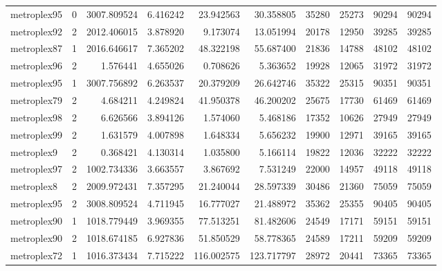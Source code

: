 \begin{longtable}{|l|r|r|r|r|r|r|r|r|r|}
metroplex95 & 0 & 3007.809524 & 6.416242 & 23.942563 & 30.358805 & 35280 & 25273 & 90294 & 90294 \\
metroplex92 & 2 & 2012.406015 & 3.878920 & 9.173074 & 13.051994 & 20178 & 12950 & 39285 & 39285 \\
metroplex87 & 1 & 2016.646617 & 7.365202 & 48.322198 & 55.687400 & 21836 & 14788 & 48102 & 48102 \\
metroplex96 & 2 & 1.576441 & 4.655026 & 0.708626 & 5.363652 & 19928 & 12065 & 31972 & 31972 \\
metroplex95 & 1 & 3007.756892 & 6.263537 & 20.379209 & 26.642746 & 35322 & 25315 & 90351 & 90351 \\
metroplex79 & 2 & 4.684211 & 4.249824 & 41.950378 & 46.200202 & 25675 & 17730 & 61469 & 61469 \\
metroplex98 & 2 & 6.626566 & 3.894126 & 1.574060 & 5.468186 & 17352 & 10626 & 27949 & 27949 \\
metroplex99 & 2 & 1.631579 & 4.007898 & 1.648334 & 5.656232 & 19900 & 12971 & 39165 & 39165 \\
metroplex9 & 2 & 0.368421 & 4.130314 & 1.035800 & 5.166114 & 19822 & 12036 & 32222 & 32222 \\
metroplex97 & 2 & 1002.734336 & 3.663557 & 3.867692 & 7.531249 & 22000 & 14957 & 49118 & 49118 \\
metroplex8 & 2 & 2009.972431 & 7.357295 & 21.240044 & 28.597339 & 30486 & 21360 & 75059 & 75059 \\
metroplex95 & 2 & 3008.809524 & 4.711945 & 16.777027 & 21.488972 & 35362 & 25355 & 90405 & 90405 \\
metroplex90 & 1 & 1018.779449 & 3.969355 & 77.513251 & 81.482606 & 24549 & 17171 & 59151 & 59151 \\
metroplex90 & 2 & 1018.674185 & 6.927836 & 51.850529 & 58.778365 & 24589 & 17211 & 59209 & 59209 \\
metroplex72 & 1 & 1016.373434 & 7.715222 & 116.002575 & 123.717797 & 28972 & 20441 & 73365 & 73365 \\
\end{longtable}
